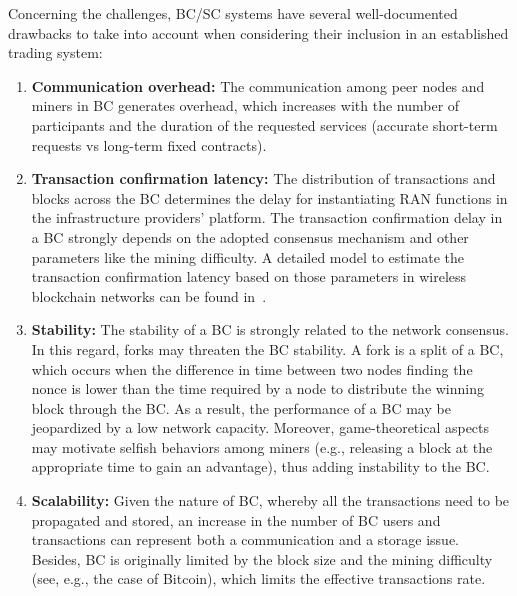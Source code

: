 \documentclass[journal]{IEEEtran}
\begin{document}
Concerning the challenges, BC/SC systems have several well-documented drawbacks to take into account when considering their inclusion in an established trading system: 
\begin{enumerate}
    \item \textbf{Communication overhead:} The communication among peer nodes and miners in BC generates overhead, which increases with the number of participants and the duration of the requested services (accurate short-term requests vs long-term fixed contracts).
    \item \textbf{Transaction confirmation latency:} The distribution of transactions and blocks across the BC determines the delay for instantiating RAN functions in the infrastructure providers' platform. The transaction confirmation delay in a BC strongly depends on the adopted consensus mechanism and other parameters like the mining difficulty. A detailed model to estimate the transaction confirmation latency based on those parameters in wireless blockchain networks can be found in~\cite{FWilhelmi_PIMRC}.
    \item \textbf{Stability:} The stability of a BC is strongly related to the network consensus. In this regard, forks may threaten the BC stability. A fork is a split of a BC, which occurs when the difference in time between two nodes finding the nonce is lower than the time required by a node to distribute the winning block through the BC. As a result, the performance of a BC may be jeopardized by a low network capacity. Moreover, game-theoretical aspects may motivate selfish behaviors among miners (e.g., releasing a block at the appropriate time to gain an advantage), thus adding instability to the BC. %
    \item \textbf{Scalability:} Given the nature of BC, whereby all the transactions need to be propagated and stored, an increase in the number of BC users and transactions can represent both a communication and a storage issue. Besides, BC is originally limited by the block size and the mining difficulty (see, e.g., the case of Bitcoin), which limits the effective transactions rate. 
\end{enumerate}
\end{document}
